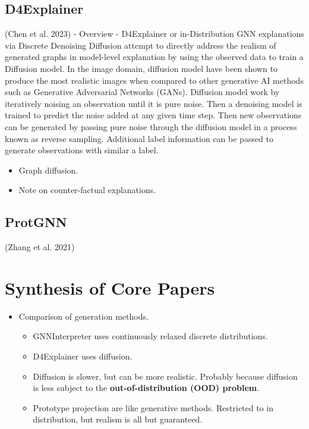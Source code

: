 \documentclass[
  11pt,
  letterpaper,
]{article}
\providecommand{\tightlist}{%
  \setlength{\itemsep}{0pt}\setlength{\parskip}{0pt}}\usepackage{longtable,booktabs,array}
\begin{document}
\hypertarget{d4explainer}{%
\subsection{D4Explainer}\label{d4explainer}}

(Chen et al. 2023) - Overview - D4Explainer or in-Distribution GNN
explanations via Discrete Denoising Diffusion attempt to directly
address the realism of generated graphs in model-level explanation by
using the observed data to train a Diffusion model. In the image domain,
diffusion model have been shown to produce the most realistic images
when compared to other generative AI methods such as Generative
Adversarial Networks (GANs). Diffusion model work by iteratively noising
an observation until it is pure noise. Then a denoising model is trained
to predict the noise added at any given time step. Then new observations
can be generated by passing pure noise through the diffusion model in a
process known as reverse sampling. Additional label information can be
passed to generate observations with similar a label.

\begin{itemize}
\item
  Graph diffusion.
\item
  Note on counter-factual explanations.
\end{itemize}

\hypertarget{protgnn}{%
\subsection{ProtGNN}\label{protgnn}}

(Zhang et al. 2021)

\hypertarget{synthesis-of-core-papers}{%
\section{Synthesis of Core Papers}\label{synthesis-of-core-papers}}

\begin{itemize}
\tightlist
\item
  Comparison of generation methods.

  \begin{itemize}
  \tightlist
  \item
    GNNInterpreter uses continuously relaxed discrete distributions.
  \item
    D4Explainer uses diffusion.
  \item
    Diffusion is slower, but can be more realistic. Probably because
    diffusion is less subject to the \textbf{out-of-distribution (OOD)
    problem}.
  \item
    Prototype projection are like generative methods. Restricted to in
    distribution, but realism is all but guaranteed.
  \end{itemize}
\end{itemize}
\end{document}

